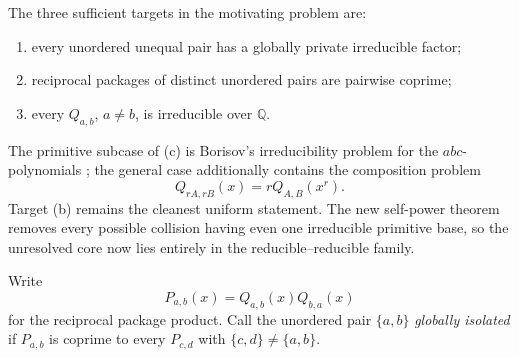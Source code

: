 \documentclass[11pt]{article}
\theoremstyle{definition}
\newcommand{\Q}{\mathbb Q}
\begin{document}
The three sufficient targets in the motivating problem are:
\begin{enumerate}[label=(\alph*)]
\item every unordered unequal pair has a globally private irreducible factor;
\item reciprocal packages of distinct unordered pairs are pairwise coprime;
\item every \(Q_{a,b}\), \(a\neq b\), is irreducible over \(\Q\).
\end{enumerate}
The primitive subcase of (c) is Borisov's irreducibility problem for the
\(abc\)-polynomials \cite{Borisov1998}; the general case additionally contains the composition
problem
\[
 Q_{rA,rB}(x)=rQ_{A,B}(x^r).
\]
Target (b) remains the cleanest uniform statement.  The new self-power theorem
removes every possible collision having even one irreducible primitive base,
so the unresolved core now lies entirely in the reducible--reducible family.

Write
\[
 P_{a,b}(x)=Q_{a,b}(x)Q_{b,a}(x)
\]
for the reciprocal package product.  Call the unordered pair \(\{a,b\}\)
\emph{globally isolated} if \(P_{a,b}\) is coprime to every
\(P_{c,d}\) with \(\{c,d\}\neq\{a,b\}\).
\end{document}
